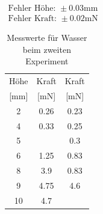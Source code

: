 \documentclass[11pt,a4paper]{article}
\begin{document}
\begin{table}[h]
\centering
$\begin{array}{l}
\textrm{Fehler Höhe: } \pm 0.03 \textrm{mm}\\
\textrm{Fehler Kraft: } \pm 0.02 \textrm{mN}
\end{array}$
\begin{tabular}{|c|c|c|}
\hline
\textrm{H\"ohe}& \textrm{Kraft} & \textrm{Kraft} \\
\textrm{[mm]} & \textrm{[mN]}& \textrm{[mN]}\\
\hline 
2 & 0.26 & 0.23\\
\hline
4 & 0.33 & 0.25\\
\hline 
5 & & 0.3\\
\hline 
6 & 1.25 & 0.83\\
\hline 
8 & 3.9 & 0.83\\ 
\hline
9 & 4.75 & 4.6\\ 
\hline
10 & 4.7 &\\ 
\hline
\end{tabular}
\caption{Messwerte für Wasser beim zweiten Experiment}
\label{tabmw}
\end{table}
\end{document}
